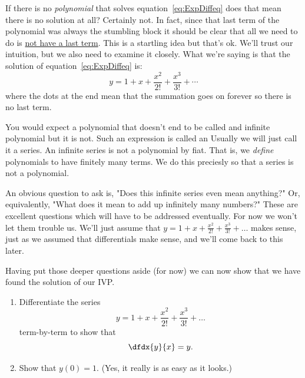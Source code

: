 

If there is no \emph{polynomial} that solves
equation~\ref{eq:ExpDiffeq} does that mean there is no solution at
all? Certainly not. In fact, since that last term of the polynomial
was always the stumbling block it should be clear that all we need
to do is \underline{not have a last term}. This is a startling idea
but that's ok. We'll trust our intuition, but we also need to
examine it closely. What we're saying is that the solution of
equation~\ref{eq:ExpDiffeq} is:
\begin{equation}
  y= 1+x+\frac{x^2}{2!}+\frac{x^3}{3!} + \cdots\label{eq:ExpSeries1}
\end{equation}
where the dots at the end mean that the summation goes on
forever so there is no last term. 

You would expect a polynomial that doesn't end to be called and
infinite polynomial but it is not. Such an expression is called an
 Usually we will just call it a series. An
infinite series is not a polynomial by fiat. That is, we \emph{define}
polynomials to have finitely many terms. We do this preciesly so that
a series is not a polynomial.

An obvious question to ask is, "Does this infinite series even mean
anything?" Or, equivalently, "What does it mean to add up infinitely
many numbers?"  These are excellent questions which will have to be
addressed eventually. For now we won't let them trouble us. We'll just
assume that $y=1+x+\frac{x^2}{2!}+\frac{x^3}{3!}+\ldots$ makes sense,
just as we assumed that differentials make sense, and we'll come back
to this later.

\begin{embeddedproblem}{}
  Having put those deeper questions aside (for now) we can now show
  that we have found the solution of our IVP.
  \begin{enumerate}[label={\bf{}(\alph*)}]{}
\item 
  Differentiate the series
  $$
  y= 1+x+\frac{x^2}{2!}+\frac{x^3}{3!} + \ldots
  $$ 
  term-by-term to show that 
  $$
  \dfdx{y}{x}= y.
  $$ 
\item Show that $y(0)=1.$ (Yes, it really is as easy as it looks.)
\end{enumerate}
\end{embeddedproblem}

